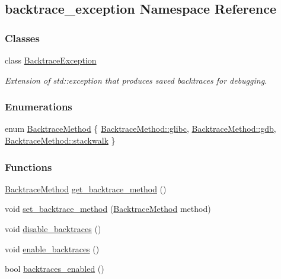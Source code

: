 \hypertarget{namespacebacktrace__exception}{}\subsection{backtrace\+\_\+exception Namespace Reference}
\label{namespacebacktrace__exception}
\subsubsection*{Classes}
\begin{DoxyCompactItemize}
\item 
class \hyperlink{classbacktrace__exception_1_1BacktraceException}{Backtrace\+Exception}
\begin{DoxyCompactList}\small\item\em Extension of std\+::exception that produces saved backtraces for debugging. \end{DoxyCompactList}\end{DoxyCompactItemize}
\subsubsection*{Enumerations}
\begin{DoxyCompactItemize}
\item 
enum \hyperlink{namespacebacktrace__exception_ac04b358e6d3eac08b792a7c2e99b57cc}{Backtrace\+Method} \{ \hyperlink{namespacebacktrace__exception_ac04b358e6d3eac08b792a7c2e99b57cca0ded6244fb02e7fb8db8e873d25656c5}{Backtrace\+Method\+::glibc}, 
\hyperlink{namespacebacktrace__exception_ac04b358e6d3eac08b792a7c2e99b57ccaca3e1c20efd5690f9789a87c66a5047a}{Backtrace\+Method\+::gdb}, 
\hyperlink{namespacebacktrace__exception_ac04b358e6d3eac08b792a7c2e99b57ccac87739aef758816341a559291c49bbbb}{Backtrace\+Method\+::stackwalk}
 \}
\end{DoxyCompactItemize}
\subsubsection*{Functions}
\begin{DoxyCompactItemize}
\item 
\hyperlink{namespacebacktrace__exception_ac04b358e6d3eac08b792a7c2e99b57cc}{Backtrace\+Method} \hyperlink{namespacebacktrace__exception_a024cd6e7707e7f7cbb9283e60907142c}{get\+\_\+backtrace\+\_\+method} ()
\item 
void \hyperlink{namespacebacktrace__exception_afe7dd97c0deefd1a0e9cb08f9c8089b2}{set\+\_\+backtrace\+\_\+method} (\hyperlink{namespacebacktrace__exception_ac04b358e6d3eac08b792a7c2e99b57cc}{Backtrace\+Method} method)
\item 
void \hyperlink{namespacebacktrace__exception_a134895cbad5bc441a941f1f49b43a78a}{disable\+\_\+backtraces} ()
\item 
void \hyperlink{namespacebacktrace__exception_a4e1b86dea1b116c7bac88d89448a808e}{enable\+\_\+backtraces} ()
\item 
bool \hyperlink{namespacebacktrace__exception_a68f7b8565eefc4f9b862c25ec47ce2b7}{backtraces\+\_\+enabled} ()
\end{DoxyCompactItemize}


